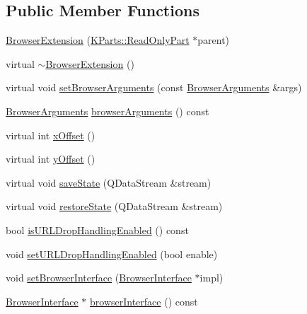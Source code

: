 \subsection*{Public Member Functions}
\begin{DoxyCompactItemize}
\item 
\hyperlink{classKParts_1_1BrowserExtension_acd4e7ef6cc706f7d65e82563085c1e31}{Browser\+Extension} (\hyperlink{classKParts_1_1ReadOnlyPart}{K\+Parts\+::\+Read\+Only\+Part} $\ast$parent)
\item 
virtual \hyperlink{classKParts_1_1BrowserExtension_a6a953bf6ca91db1779fdd5d52e5f5b0d}{$\sim$\+Browser\+Extension} ()
\item 
virtual void \hyperlink{classKParts_1_1BrowserExtension_a19637ad8f74585047a4477506db764bd}{set\+Browser\+Arguments} (const \hyperlink{structKParts_1_1BrowserArguments}{Browser\+Arguments} \&args)
\item 
\hyperlink{structKParts_1_1BrowserArguments}{Browser\+Arguments} \hyperlink{classKParts_1_1BrowserExtension_a8bd50c2c5bd6b43d15c4af157977cc42}{browser\+Arguments} () const 
\item 
virtual int \hyperlink{classKParts_1_1BrowserExtension_a8c8b975e3805b54a32e28c1a1b66319a}{x\+Offset} ()
\item 
virtual int \hyperlink{classKParts_1_1BrowserExtension_a205e59060b7b7d6daf1c25bf9cfdcee5}{y\+Offset} ()
\item 
virtual void \hyperlink{classKParts_1_1BrowserExtension_afe2fe963a5097ad43bea5d076485e759}{save\+State} (Q\+Data\+Stream \&stream)
\item 
virtual void \hyperlink{classKParts_1_1BrowserExtension_a26bba6343df8031d9aceb94cf6c6ef47}{restore\+State} (Q\+Data\+Stream \&stream)
\item 
bool \hyperlink{classKParts_1_1BrowserExtension_ad28ffe47eb30efa2dde7ba4b5684570e}{is\+U\+R\+L\+Drop\+Handling\+Enabled} () const 
\item 
void \hyperlink{classKParts_1_1BrowserExtension_a16e798977df4a2992e0f60a9dc01d33f}{set\+U\+R\+L\+Drop\+Handling\+Enabled} (bool enable)
\item 
void \hyperlink{classKParts_1_1BrowserExtension_a9803f929d3103b57b7d50e1bd45ea280}{set\+Browser\+Interface} (\hyperlink{classKParts_1_1BrowserInterface}{Browser\+Interface} $\ast$impl)
\item 
\hyperlink{classKParts_1_1BrowserInterface}{Browser\+Interface} $\ast$ \hyperlink{classKParts_1_1BrowserExtension_a7a4bdce73bd132afb5e9864184592fef}{browser\+Interface} () const 

\end{DoxyCompactItemize}
